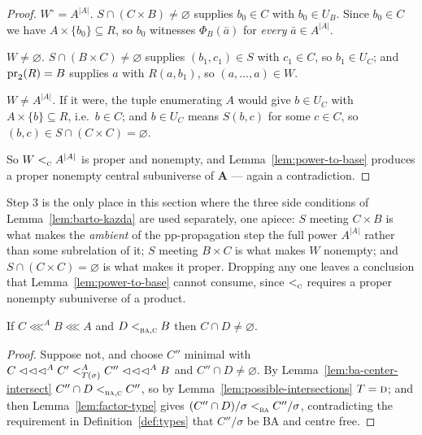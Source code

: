 \begin{proof}
\emph{$W^{\circ}=A^{|A|}$.} $S\cap(C\times B)\neq\varnothing$ supplies
$b_{0}\in C$ with $b_{0}\in U_{B}$. Since $b_{0}\in C$ we have
$A\times\{b_{0}\}\subseteq R$, so $b_{0}$ witnesses $\Phi_{B}(\bar a)$ for
\emph{every} $\bar a\in A^{|A|}$.

\emph{$W\neq\varnothing$.} $S\cap(B\times C)\neq\varnothing$ supplies
$(b_{1},c_{1})\in S$ with $c_{1}\in C$, so $b_{1}\in U_{C}$; and
$\proj_{2}(R)=B$ supplies $a$ with $R(a,b_{1})$, so
$(a,\dots,a)\in W$.

\emph{$W\neq A^{|A|}$.} If it were, the tuple enumerating $A$ would give
$b\in U_{C}$ with $A\times\{b\}\subseteq R$, i.e.\ $b\in C$; and $b\in U_{C}$
means $S(b,c)$ for some $c\in C$, so $(b,c)\in S\cap(C\times C)=\varnothing$.

So $W\subt{\TC}A^{|A|}$ is proper and nonempty, and
Lemma~\ref{lem:power-to-base} produces a proper nonempty central subuniverse of
$\mathbf A$ --- again a contradiction.
\end{proof}

\begin{hazard}\label{haz:bacon-left}
Step 3 is the only place in this section where the three side conditions of
Lemma~\ref{lem:barto-kazda} are used separately, one apiece: $S$ meeting
$C\times B$ is what makes the \emph{ambient} of the pp-propagation step the
full power $A^{|A|}$ rather than some subrelation of it; $S$ meeting
$B\times C$ is what makes $W$ nonempty; and $S\cap(C\times C)=\varnothing$ is
what makes it proper. Dropping any one leaves a conclusion that
Lemma~\ref{lem:power-to-base} cannot consume, since $\subt{\TC}$ requires a
proper nonempty subuniverse of a product.
\end{hazard}

\begin{lemma}\label{lem:strong-nonempty}
If $C\lll^{A}B\lll A$ and $D\subt{\TBA,\TC}B$ then $C\cap D\neq\varnothing$.
\end{lemma}

\begin{proof}
Suppose not, and choose $C''$ minimal with
$C\lll^{A}C'\subt[A]{T(\sigma)}C''\lll^{A}B$ and $C''\cap D\neq\varnothing$.
By Lemma~\ref{lem:ba-center-intersect} $C''\cap D\subt{\TBA,\TC}C''$, so by
Lemma~\ref{lem:possible-intersections} $T=\TD$; and then
Lemma~\ref{lem:factor-type} gives
$(C''\cap D)/\sigma\subt{\TBA}C''/\sigma$, contradicting the requirement in
Definition~\ref{def:types} that $C''/\sigma$ be BA and centre free.
\end{proof}

